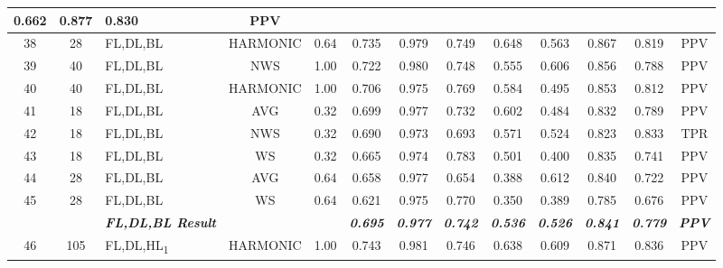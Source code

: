 \begin{table}[H]
{\begin{tabular}{cc|l|cc|c|c|c|c|c|c|c|c|}
    0.662 &
    0.877 &
    0.830 &
    PPV \\ \hline
  \multicolumn{1}{|c|}{38} &
    28 &
    FL,DL,BL &
    \multicolumn{1}{c|}{HARMONIC} &
    0.64 &
    0.735 &
    0.979 &
    0.749 &
    0.648 &
    0.563 &
    0.867 &
    0.819 &
    PPV \\ \hline
  \multicolumn{1}{|c|}{39} &
    40 &
    FL,DL,BL &
    \multicolumn{1}{c|}{NWS} &
    1.00 &
    0.722 &
    0.980 &
    0.748 &
    0.555 &
    0.606 &
    0.856 &
    0.788 &
    PPV \\ \hline
  \multicolumn{1}{|c|}{40} &
    40 &
    FL,DL,BL &
    \multicolumn{1}{c|}{HARMONIC} &
    1.00 &
    0.706 &
    0.975 &
    0.769 &
    0.584 &
    0.495 &
    0.853 &
    0.812 &
    PPV \\ \hline
  \multicolumn{1}{|c|}{41} &
    18 &
    FL,DL,BL &
    \multicolumn{1}{c|}{AVG} &
    0.32 &
    0.699 &
    0.977 &
    0.732 &
    0.602 &
    0.484 &
    0.832 &
    0.789 &
    PPV \\ \hline
  \multicolumn{1}{|c|}{42} &
    18 &
    FL,DL,BL &
    \multicolumn{1}{c|}{NWS} &
    0.32 &
    0.690 &
    0.973 &
    0.693 &
    0.571 &
    0.524 &
    0.823 &
    0.833 &
    TPR \\ \hline
  \multicolumn{1}{|c|}{43} &
    18 &
    FL,DL,BL &
    \multicolumn{1}{c|}{WS} &
    0.32 &
    0.665 &
    0.974 &
    0.783 &
    0.501 &
    0.400 &
    0.835 &
    0.741 &
    PPV \\ \hline
  \multicolumn{1}{|c|}{44} &
    28 &
    FL,DL,BL &
    \multicolumn{1}{c|}{AVG} &
    0.64 &
    0.658 &
    0.977 &
    0.654 &
    0.388 &
    0.612 &
    0.840 &
    0.722 &
    PPV \\ \hline
  \multicolumn{1}{|c|}{45} &
    28 &
    FL,DL,BL &
    \multicolumn{1}{c|}{WS} &
    0.64 &
    0.621 &
    0.975 &
    0.770 &
    0.350 &
    0.389 &
    0.785 &
    0.676 &
    PPV \\ \hline
   &
    \textit{\textbf{}} &
    \textit{\textbf{FL,DL,BL Result}} &
     &
     &
    \textit{\textbf{0.695}} &
    \textit{\textbf{0.977}} &
    \textit{\textbf{0.742}} &
    \textit{\textbf{0.536}} &
    \textit{\textbf{0.526}} &
    \textit{\textbf{0.841}} &
    \textit{\textbf{0.779}} &
    \textit{\textbf{PPV}} \\ \hline
  \multicolumn{1}{|c|}{46} &
    105 &
    FL,DL,HL\textsubscript{1} &
    \multicolumn{1}{c|}{HARMONIC} &
    1.00 &
    0.743 &
    0.981 &
    0.746 &
    0.638 &
    0.609 &
    0.871 &
    0.836 &
    PPV \\ \hline

\end{tabular}}
\end{table}
